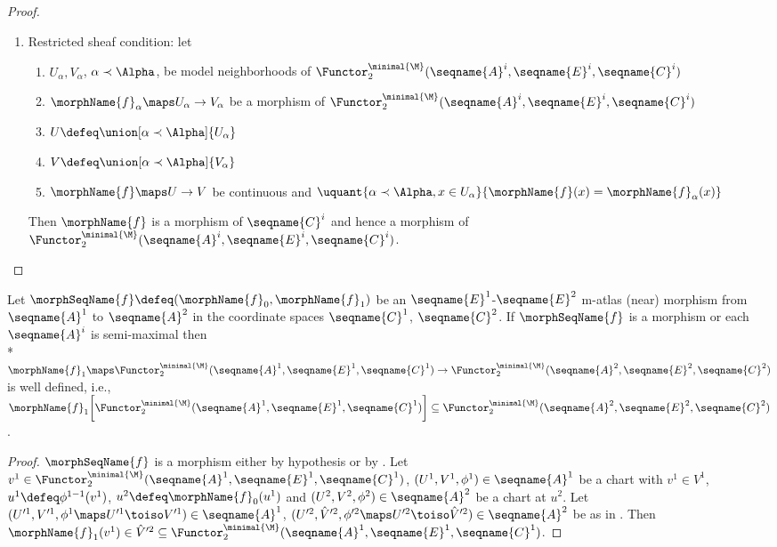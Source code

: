 \documentclass{article}
\begin{document}
\begin{lemma}
\begin{proof}
\begin{enumerate}
\item Restricted sheaf condition: let
\begin{enumerate}
\item $U_\alpha,V_\alpha$, $\alpha \prec \Alpha$, be model
neighborhoods of
$
    \Functor^{\minimal{\M}}_2
      (\seqname{A}^i, \seqname{E}^i, \seqname{C}^i)
$
\item $\morphName{f}_\alpha \maps U_\alpha \to V_\alpha$ be a morphism of
$
      \Functor^{\minimal{\M}}_2
        (\seqname{A}^i, \seqname{E}^i, \seqname{C}^i)
$
\item $U \defeq \union[\alpha \prec \Alpha]{U_\alpha}$
\item $V \defeq \union[\alpha \prec \Alpha]{V_\alpha}$
\item $\morphName{f} \maps U \to V$ be continuous and
$
  \uquant
    {{\alpha \prec \Alpha},{x \in U_\alpha}}
    {\morphName{f}(x) = \morphName{f}_\alpha(x)}
$
\end{enumerate}
Then $\morphName{f}$ is a morphism of $\seqname{C}^i$ and hence a
morphism of
$
      \Functor^{\minimal{\M}}_2
        (\seqname{A}^i, \seqname{E}^i, \seqname{C}^i)
$.
\end{enumerate}
\end{proof}

Let $\morphSeqName{f} \defeq (\morphName{f}_0, \morphName{f}_1)$ be an
$\seqname{E}^1$-$\seqname{E}^2$ m-atlas (near) morphism from
$\seqname{A}^1$ to $\seqname{A}^2$ in the coordinate spaces
$\seqname{C}^1$, $\seqname{C}^2$.  If $\morphSeqName{f}$ is a morphism or
each $\seqname{A}^i$ is semi-maximal then \\*
$
  \morphName{f}_1
  \maps
  \Functor^{\minimal{\M}}_2 (\seqname{A}^1, \seqname{E}^1, \seqname{C}^1)
  \to
  \Functor^{\minimal{\M}}_2 (\seqname{A}^2, \seqname{E}^2, \seqname{C}^2)
$
is well defined, i.e.,
$
  \morphName{f}_1
    \biggl [
      \Functor^{\minimal{\M}}_2
        (\seqname{A}^1, \seqname{E}^1, \seqname{C}^1)
    \biggr ]
  \subseteq
      \Functor^{\minimal{\M}}_2
        (\seqname{A}^2, \seqname{E}^2, \seqname{C}^2)
$.

\begin{proof}
$\morphSeqName{f}$ is a morphism either by hypothesis or by
.
Let
$
  v^1 \in
  \Functor^{\minimal{\M}}_2
    (\seqname{A}^1, \seqname{E}^1, \seqname{C}^1)
$,
$(U^1,V^1,\phi^1) \in \seqname{A}^1$ be a chart with $v^1 \in V^1$,
$u^1 \defeq \phi^{1-1}(v^1)$, $u^2 \defeq \morphName{f}_0(u^1)$ and
$(U^2,V^2,\phi^2) \in \seqname{A}^2$ be a chart at $u^2$.
Let $(U'^1, V'^1, \phi^1 \maps U'^1 \toiso V'^1) \in \seqname{A}^1$,
$
  (U'^2 ,\hat{V}'^2, \phi'^2 \maps U'^2 \toiso \hat{V}'^2)
  \in \seqname{A}^2
$
be as in . Then
$
  \morphName{f}_1(v^1) \in
  \hat{V}'^2 \subseteq
  \Functor^{\minimal{\M}}_2
    (\seqname{A}^1, \seqname{E}^1, \seqname{C}^1)
$.
\end{proof}
\end{lemma}
\end{document}
